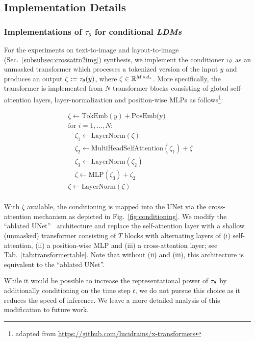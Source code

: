 \documentclass[10pt,twocolumn,letterpaper]{article}
\begin{document}
\subsection{Implementation Details}
\label{suppsec:implementation_details}

\subsubsection{Implementations of $\tau_\theta$ for conditional \emph{LDMs}}
\label{suppsubsubsec:transformer}
For the experiments on text-to-image and layout-to-image (Sec.~\ref{subsubsec:crossattn2img}) synthesis, 
we implement the conditioner $\tau_\theta$ as an unmasked transformer which processes 
a tokenized version of the input $y$ and produces an output $\zeta := \tau_\theta(y)$, 
where $\zeta \in \mathbb{R}^{M \times d_\tau}$.
More specifically, the transformer is implemented from $N$ transformer blocks consisting of 
global self-attention layers, layer-normalization and 
position-wise MLPs as follows\footnote{adapted from \url{https://github.com/lucidrains/x-transformers}}: 

\begin{align}
&\zeta \leftarrow \text{TokEmb}(y) + \text{PosEmb(y)} \\
%
&\text{for } i=1,\dots,N: \nonumber \\
 &\quad \zeta_1 \leftarrow \text{LayerNorm}(\zeta) \\
 &\quad \zeta_2 \leftarrow \text{MultiHeadSelfAttention}(\zeta_1) + \zeta \\
 &\quad \zeta_3 \leftarrow \text{LayerNorm}(\zeta_2)  \\
 &\quad \zeta \leftarrow \text{MLP}(\zeta_3) + \zeta_2  \\ 
& \zeta \leftarrow \text{LayerNorm}(\zeta)  \\
\end{align}

With $\zeta$ available, the conditioning is mapped into the UNet via the cross-attention mechanism 
as depicted in Fig.~\ref{fig:conditioning}. We modify the ``ablated UNet''~\cite{DBLP:journals/corr/abs-2105-05233} architecture
and replace the self-attention layer with a shallow (unmasked) transformer consisting 
of $T$ blocks with alternating layers of (i) self-attention, (ii) a position-wise MLP and
(iii) a cross-attention layer; see Tab.~\ref{tab:transformertable}. Note that without (ii) and (iii), this
architecture is equivalent to the ``ablated UNet''.

While it would be possible to increase the representational power of $\tau_\theta$ 
by additionally conditioning on the time step $t$, we do not pursue this choice as it reduces the speed of inference. 
We leave a more detailed analysis of this modification to future work.
\end{document}

